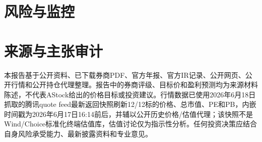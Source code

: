 \documentclass[a4paper,11pt,openany,fontset=none]{ctexrep}
\begin{document}
\chapter{风险与监控}


\appendix
\chapter{来源与主张审计}


\clearpage
\thispagestyle{empty}
\vspace*{4cm}
\begin{disclosurebox}[免责声明]
\small
本报告基于公开资料、已下载券商PDF、官方年报、官方IR记录、公开网页、公开行情和公开持仓代理整理。报告中的券商评级、目标价和盈利预测均为来源材料陈述，不代表AStock给出的价格目标或投资建议。行情数据已使用2026年6月18日抓取的腾讯quote feed最新返回快照刷新12/12标的价格、总市值、PE和PB，内嵌时间戳为2026年6月17日16:14前后，并辅以公开历史价格/估值代理；该快照不是Wind/Choice标准化终端估值库，估值讨论仅为指示性分析。任何投资决策应结合自身风险承受能力、最新披露资料和专业意见。
\end{disclosurebox}
\end{document}
